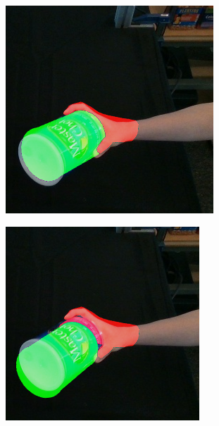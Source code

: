 \begin{figure}[h!]
\begin{subfigure}[b]{0.16\linewidth}
  \end{subfigure}
    \begin{subfigure}[b]{0.16\linewidth}
    \includegraphics[width=0.98\linewidth]{figs/1000_5}
  \end{subfigure}
    \begin{subfigure}[b]{0.16\linewidth}
    \includegraphics[width=0.98\linewidth]{figs/1000_8}
  \end{subfigure}  
  \vspace{0.2cm}
  

\end{figure}
